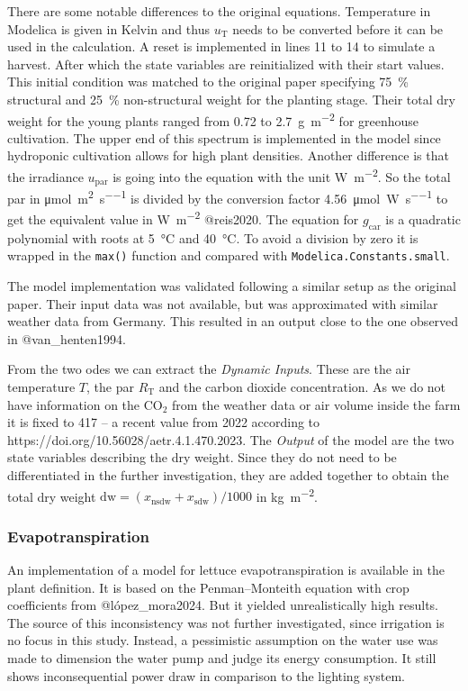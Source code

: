 There are some notable differences to the original equations.
Temperature in Modelica is given in Kelvin and thus $u_\text{T}$ needs to be converted before it can be used in the calculation.
A reset is implemented in lines 11 to 14 to simulate a harvest.
After which the state variables are reinitialized with their start values.
This initial condition was matched to the original paper specifying \SI{75}{\percent} structural and \SI{25}{\percent} non-structural weight for the planting stage.
Their total dry weight for the young plants ranged from 0.72 to \SI{2.7}{\g\per\square\m} for greenhouse cultivation.
The upper end of this spectrum is implemented in the model since hydroponic cultivation allows for high plant densities.
Another difference is that the irradiance $u_{\text{par}}$ is going into the equation with the unit \si{\W\per\square\m}.
So the total \ac{par} in \si{\umol\per\square\m\per\s} is divided by the conversion factor \SI{4.56}{\umol\per\W\per\s} to get the equivalent value in \si{\W\per\square\m} @reis2020.
The equation for $g_\text{car}$ is a quadratic polynomial with roots at \SI{5}{\degreeCelsius} and \SI{40}{\degreeCelsius}.
To avoid a division by zero it is wrapped in the \lstinline{max()} function and compared with \lstinline{Modelica.Constants.small}.

The model implementation was validated following a similar setup as the original paper.
Their input data was not available, but was approximated with similar weather data from Germany.
This resulted in an output close to the one observed in @van\_henten1994.

From the two \acp{ode} we can extract the \textit{Dynamic Inputs}.
These are the air temperature $T$, the \ac{par} $R_\text{T}$ and the carbon dioxide concentration.
As we do not have information on the CO$_2$ from the weather data or air volume inside the farm it is fixed to \SI{417}{\ppm} -- a recent value from 2022 according to https://doi.org/10.56028/aetr.4.1.470.2023.
The \textit{Output} of the model are the two state variables describing the dry weight.
Since they do not need to be differentiated in the further investigation, they are added together to obtain the total dry weight $\text{dw} = (x_\text{nsdw} + x_\text{sdw}) / 1000$ in \si{\kg\per\square\m}.

\subsubsection{Evapotranspiration}
An implementation of a model for lettuce evapotranspiration is available in the plant definition.
It is based on the Penman–Monteith equation with crop coefficients from @lópez\_mora2024.
But it yielded unrealistically high results.
The source of this inconsistency was not further investigated, since irrigation is no focus in this study.
Instead, a pessimistic assumption on the water use was made to dimension the water pump and judge its energy consumption.
It still shows inconsequential power draw in comparison to the lighting system.

